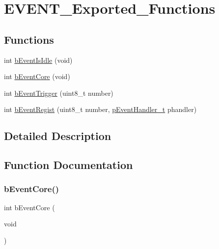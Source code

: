 \hypertarget{group___e_v_e_n_t___exported___functions}{}\section{E\+V\+E\+N\+T\+\_\+\+Exported\+\_\+\+Functions}
\label{group___e_v_e_n_t___exported___functions}
\subsection*{Functions}
\begin{DoxyCompactItemize}
\item 
int \mbox{\hyperlink{group___e_v_e_n_t___exported___functions_gaf35861b274c94a78608b1b91cf6fd372}{b\+Event\+Is\+Idle}} (void)
\item 
int \mbox{\hyperlink{group___e_v_e_n_t___exported___functions_ga26365b33e6409bf4f159c8d05ec5b4e0}{b\+Event\+Core}} (void)
\item 
int \mbox{\hyperlink{group___e_v_e_n_t___exported___functions_gadc55a82244272fc49fa06cdec8d88dbc}{b\+Event\+Trigger}} (uint8\+\_\+t number)
\item 
int \mbox{\hyperlink{group___e_v_e_n_t___exported___functions_ga8d380a0bb3c6afb59e9f30e0de7acf39}{b\+Event\+Regist}} (uint8\+\_\+t number, \mbox{\hyperlink{group___e_v_e_n_t___exported___types_definitions_ga42b0d7ce13d1e439f8fe00eec38e90d1}{p\+Event\+Handler\+\_\+t}} phandler)
\end{DoxyCompactItemize}


\subsection{Detailed Description}


\subsection{Function Documentation}
\mbox{\label{group___e_v_e_n_t___exported___functions_ga26365b33e6409bf4f159c8d05ec5b4e0}} 
\subsubsection{\texorpdfstring{b\+Event\+Core()}{bEventCore()}}
{\footnotesize\ttfamily int b\+Event\+Core (\begin{DoxyParamCaption}\item[{void}]{ }\end{DoxyParamCaption})}

